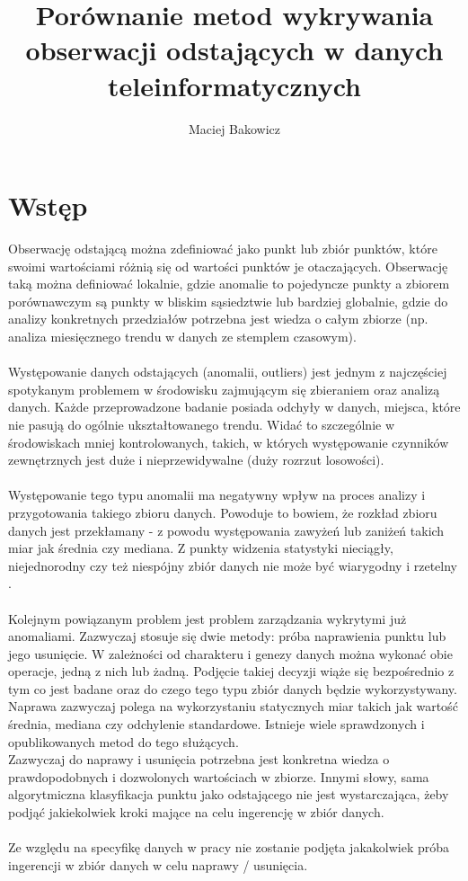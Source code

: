 \documentclass[eng,printmode]{mgr}
\title{Porównanie metod wykrywania obserwacji odstających w danych teleinformatycznych}
\author{Maciej Bakowicz}
\begin{document}

\maketitle 

\tableofcontents 

\chapter{Wstęp}  
Obserwację odstającą można zdefiniować jako punkt lub zbiór punktów, które swoimi wartościami różnią się od wartości punktów je otaczających. Obserwację taką można definiować lokalnie, gdzie anomalie to pojedyncze punkty a zbiorem porównawczym są punkty w bliskim sąsiedztwie lub bardziej globalnie, gdzie do analizy konkretnych przedziałów potrzebna jest wiedza o całym zbiorze (np. analiza miesięcznego trendu w danych ze stemplem czasowym). 
\\ \\
Występowanie danych odstających (anomalii, outliers) jest jednym z najczęściej spotykanym problemem w środowisku zajmującym się zbieraniem oraz analizą danych. Każde przeprowadzone badanie posiada odchyły w danych, miejsca, które nie pasują do ogólnie ukształtowanego trendu. Widać to szczególnie w środowiskach mniej kontrolowanych, takich, w których występowanie czynników zewnętrznych jest duże i nieprzewidywalne (duży rozrzut losowości). \\ \\
Występowanie tego typu anomalii ma negatywny wpływ na proces analizy i przygotowania takiego zbioru danych. Powoduje to bowiem, że rozkład zbioru danych jest przekłamany - z powodu występowania zawyżeń lub zaniżeń takich miar jak średnia czy mediana. Z punkty widzenia statystyki nieciągły, niejednorodny czy też niespójny zbiór danych nie może być wiarygodny i rzetelny \cite{outliers-impact}.
\\ \\
Kolejnym powiązanym problem jest problem zarządzania wykrytymi już anomaliami. Zazwyczaj stosuje się dwie metody: próba naprawienia punktu lub jego usunięcie. W zależności od charakteru i genezy danych można wykonać obie operacje, jedną z nich lub żadną. Podjęcie takiej decyzji wiąże się bezpośrednio z tym co jest badane oraz do czego tego typu zbiór danych będzie wykorzystywany. \\
Naprawa zazwyczaj polega na wykorzystaniu statycznych miar takich jak wartość średnia, mediana czy odchylenie standardowe. Istnieje wiele sprawdzonych i opublikowanych metod do tego służących. \\
Zazwyczaj do naprawy i usunięcia potrzebna jest konkretna wiedza o prawdopodobnych i dozwolonych wartościach w zbiorze. Innymi słowy, sama algorytmiczna klasyfikacja punktu jako odstającego nie jest wystarczająca, żeby podjąć jakiekolwiek kroki mające na celu ingerencję w zbiór danych. 
\\ \\ 
Ze względu na specyfikę danych w pracy nie zostanie podjęta jakakolwiek próba ingerencji w zbiór danych w celu naprawy / usunięcia.
\end{document}
